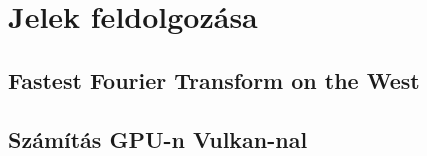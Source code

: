 
\section{Jelek feldolgoz\'asa}


\subsection{Fastest Fourier Transform on the West}

\subsection{Sz\'am\'it\'as GPU-n Vulkan-nal}